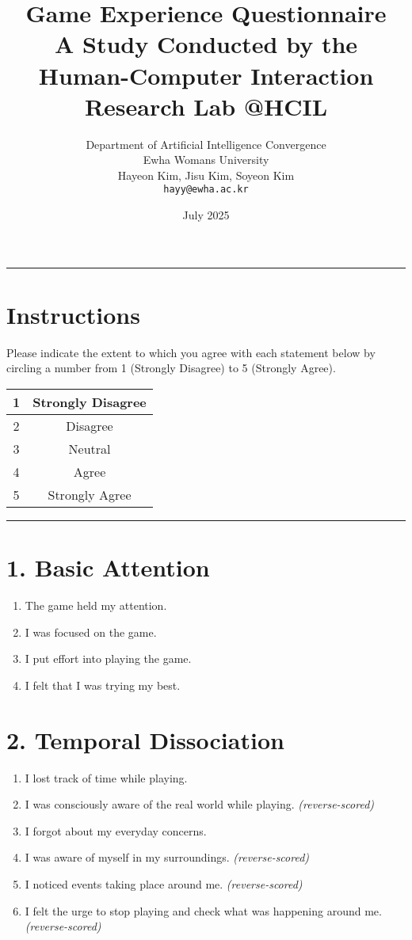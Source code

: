 \documentclass[12pt]{article}
\title{\textbf{Game Experience Questionnaire}\\[0.5em]
\large A Study Conducted by the Human-Computer Interaction Research Lab @HCIL}
\author{Department of Artificial Intelligence Convergence\\
Ewha Womans University\\
Hayeon Kim, Jisu Kim, Soyeon Kim\\
\texttt{hayy@ewha.ac.kr}}
\date{July 2025}
\begin{document}
\maketitle
\hrule
\vspace{0.5cm}

\section*{Instructions}
Please indicate the extent to which you agree with each statement below by circling a number from 1 (Strongly Disagree) to 5 (Strongly Agree).

\vspace{0.5cm}

\begin{center}
\begin{tabular}{|c|c|}
\hline
1 & Strongly Disagree \\
\hline
2 & Disagree \\
\hline
3 & Neutral \\
\hline
4 & Agree \\
\hline
5 & Strongly Agree \\
\hline
\end{tabular}
\end{center}

\vspace{0.5cm}
\hrule
\vspace{0.5cm}

\section*{1. Basic Attention}

\begin{enumerate}[label=\arabic*.]
  \item The game held my attention.
  \item I was focused on the game.
  \item I put effort into playing the game.
  \item I felt that I was trying my best.
\end{enumerate}

\section*{2. Temporal Dissociation}

\begin{enumerate}[resume]
  \item I lost track of time while playing.
  \item I was consciously aware of the real world while playing. \textit{(reverse-scored)}
  \item I forgot about my everyday concerns.
  \item I was aware of myself in my surroundings. \textit{(reverse-scored)}
  \item I noticed events taking place around me. \textit{(reverse-scored)}
  \item I felt the urge to stop playing and check what was happening around me. \textit{(reverse-scored)}
\end{enumerate}
\end{document}

